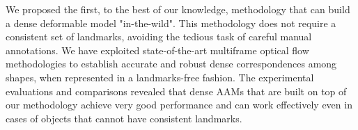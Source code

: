 We proposed the first, to the best of our knowledge, methodology that can build a dense deformable model "in-the-wild". This methodology does not require a consistent set of landmarks, avoiding the tedious task of careful manual annotations. We have exploited state-of-the-art multiframe optical flow methodologies to establish accurate and robust dense correspondences among shapes, when represented in a landmarks-free fashion. The experimental evaluations and comparisons revealed that dense AAMs that are built on top of our methodology achieve very good performance and can work effectively even in cases of objects that cannot have consistent landmarks.